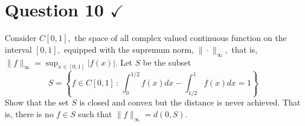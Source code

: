 \section{Question 10 \texorpdfstring{$\checkmark$}{}}

\horz
Consider $C[0,1],$ the space of all complex valued continuous function on the interval $[0,1],$ equipped with the supremum norm, $\|\cdot\|_{\infty},$ that is, $\|f\|_{\infty}=\sup_{x\in [0,1]} |f(x)|.$ Let $S$ be the subset
    \begin{equation*}
	S=\left\{ f \in C[0,1] \, : \, \int_{0}^{1/2} f\left( x \right) dx - \int_{1/2}^{1} f \left( x \right) dx =1 \right\}
    \end{equation*}
    Show that the set $S$ is closed and convex but the distance is never achieved. That is, there is no $f\in S$ such that $\|f\|_{\infty} = d(0,S)$.
    
